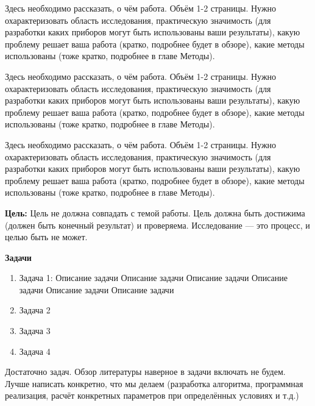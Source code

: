 \documentclass[a4paper,14pt]{extarticle}
\begin{document}


\tableofcontents
\pagebreak


Здесь необходимо рассказать, о чём работа. Объём 1-2 страницы. Нужно охарактеризовать область исследования, практическую значимость (для разработки каких приборов могут быть использованы ваши результаты), какую проблему решает ваша работа (кратко, подробнее будет в обзоре), какие методы использованы (тоже кратко, подробнее в главе Методы).

Здесь необходимо рассказать, о чём работа. Объём 1-2 страницы. Нужно охарактеризовать область исследования, практическую значимость (для разработки каких приборов могут быть использованы ваши результаты), какую проблему решает ваша работа (кратко, подробнее будет в обзоре), какие методы использованы (тоже кратко, подробнее в главе Методы).

Здесь необходимо рассказать, о чём работа. Объём 1-2 страницы. Нужно охарактеризовать область исследования, практическую значимость (для разработки каких приборов могут быть использованы ваши результаты), какую проблему решает ваша работа (кратко, подробнее будет в обзоре), какие методы использованы (тоже кратко, подробнее в главе Методы).

\label{Tasks}

\textbf{Цель:} Цель не должна совпадать с темой работы. Цель должна быть достижима (должен быть конечный результат) и проверяема. Исследование --- это процесс, и целью быть не может.

\textbf{Задачи}
\begin{enumerate}
    \item {
        Задача 1: Описание задачи Описание задачи Описание задачи Описание задачи Описание задачи Описание задачи
        }
    \item Задача 2
    \item Задача 3
    \item Задача 4
\end{enumerate}

Достаточно задач. Обзор литературы наверное в задачи включать не будем. Лучше написать конкретно, что мы делаем (разработка алгоритма, программная реализация, расчёт конкретных параметров при определённых условиях и т.д.)

\pagebreak
\end{document}

